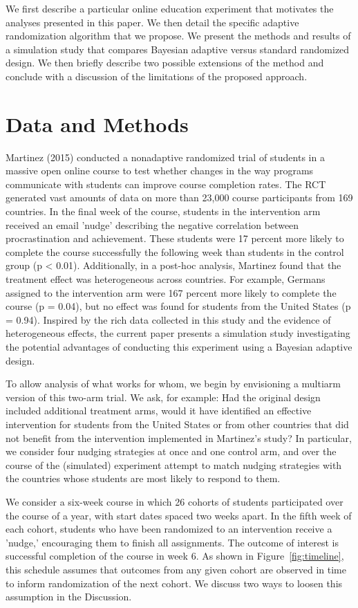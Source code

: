 \documentclass{acm_proc_article-sp}
\begin{document}
We first describe a particular online education experiment that motivates the analyses presented in this paper. 
We then detail the specific adaptive randomization algorithm that we propose. We present the methods and results of a simulation study that compares Bayesian adaptive versus standard randomized design. 
We then briefly describe two possible extensions of the method and conclude with a discussion of the limitations of the proposed approach.


\section{Data and Methods}
Martinez (2015) \cite{martinez2014never} conducted a nonadaptive randomized trial of students in a massive open online course to test whether changes in the way programs communicate with students can improve course completion rates. 
The RCT generated vast amounts of data on more than 23,000 course participants from 169 countries.  
In the final week of the course, students in the intervention arm received an email 'nudge' describing the negative correlation between procrastination and achievement. 
These students were 17 percent more likely to complete the course successfully the following week than students in the control group (p < 0.01). 
Additionally, in a post-hoc analysis, Martinez found that the treatment effect was heterogeneous across countries. 
For example, Germans assigned to the intervention arm were 167 percent more likely to complete the course (p = 0.04), but no effect was found for students from the United States (p = 0.94). 
Inspired by the rich data collected in this study and the evidence of heterogeneous effects, the current paper presents a simulation study investigating the potential advantages of conducting this experiment using a Bayesian adaptive design.

To allow analysis of what works for whom, we begin by envisioning a multiarm version of this two-arm trial. 
We ask, for example: Had the original design included additional treatment arms, would it have identified an effective intervention for students from the United States or from other countries that did not benefit from the intervention implemented in Martinez's study? 
In particular, we consider four nudging strategies at once and one control arm, and over the course of the (simulated) experiment attempt to match nudging strategies with the countries whose students are most likely to respond to them.

We consider a six-week course in which 26 cohorts of students participated over the course of a year, with start dates spaced two weeks apart. 
In the fifth week of each cohort, students who have been randomized to an intervention receive a 'nudge,' encouraging them to finish all assignments. 
The outcome of interest is successful completion of the course in week 6. 
As shown in Figure~\ref{fig:timeline}, this schedule assumes that outcomes from any given cohort are observed in time to inform randomization of the next cohort. 
We discuss two ways to loosen this assumption in the Discussion. 
\end{document}
